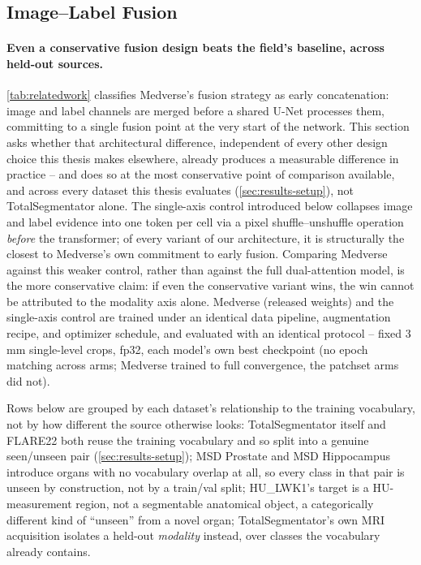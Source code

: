\subsection{Image--Label Fusion}\label{sec:results-fusion}

\paragraph{Even a conservative fusion design beats the field's baseline, across held-out
sources.} \autoref{tab:relatedwork} classifies Medverse's fusion strategy as early
concatenation: image and label channels are merged before a shared U-Net processes them,
committing to a single fusion point at the very start of the network. This section asks
whether that architectural difference, independent of every other design choice this
thesis makes elsewhere, already produces a measurable difference in practice -- and does
so at the most conservative point of comparison available, and across every dataset this
thesis evaluates (\autoref{sec:results-setup}), not TotalSegmentator alone. The
single-axis control introduced below collapses image and label evidence into one token per
cell via a pixel shuffle--unshuffle operation \emph{before} the transformer; of every
variant of our architecture, it is structurally the closest to Medverse's own commitment to
early fusion. Comparing Medverse against this weaker control, rather than against the full
dual-attention model, is the more conservative claim: if even the conservative variant wins, the
win cannot be attributed to the modality axis alone. Medverse (released weights) and the
single-axis control are trained under an identical data pipeline, augmentation recipe, and
optimizer schedule, and evaluated with an identical protocol -- fixed 3\,mm single-level
crops, fp32, each model's own best checkpoint (no epoch matching across arms; Medverse
trained to full convergence, the patchset arms did not).

Rows below are grouped by each dataset's relationship to the training vocabulary, not by
how different the source otherwise looks: TotalSegmentator itself and FLARE22 both reuse
the training vocabulary and so split into a genuine
seen/unseen pair (\autoref{sec:results-setup}); MSD Prostate and MSD Hippocampus introduce
organs with no vocabulary overlap at all, so every class in that pair is unseen by
construction, not by a train/val split; HU\_LWK1's target is a HU-measurement region, not a
segmentable anatomical object, a categorically different kind of ``unseen'' from a novel
organ; TotalSegmentator's own MRI acquisition isolates a held-out \emph{modality} instead,
over classes the vocabulary already contains.

